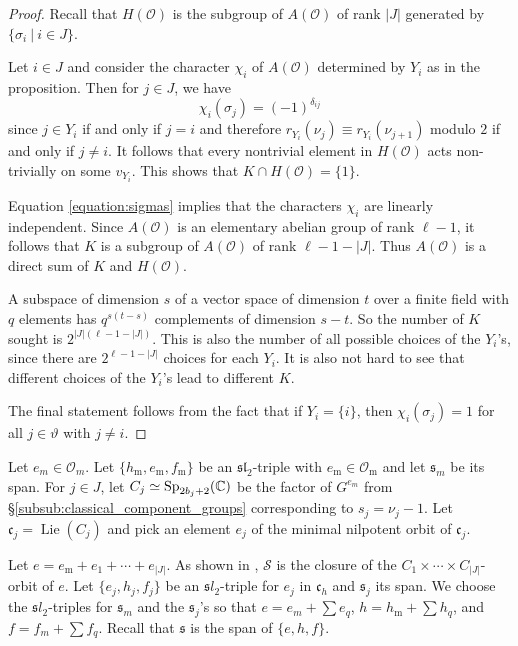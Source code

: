 \documentclass{amsart}
\theoremstyle{definition}
\DeclareMathOperator{\Lie}{Lie}
\newcommand{\C}{\mathbb{C}}
\newcommand{\m}{\mathrm{m}}
\newcommand{\cg}{\mathfrak{c}}
\newcommand{\fs}{\mathfrak{s}}
\newcommand{\0}{\mathcal{O}}
\begin{document}

\begin{proof}
Recall that $H(\0)$ is the subgroup of $A(\0)$ of rank $|J|$ 
generated by $\{\sigma_i \ | \ i \in J\}$. 

Let $i\in J$ and consider the character $\chi_i$ of $A(\0)$ determined by $Y_i$ as in the proposition.  
Then for $j \in J$, we have 
\begin{equation} \label{equation:sigmas}
\chi_i(\sigma_j)=(-1)^{\delta_{ij}}    
\end{equation}
since $j \in Y_i$ if and only if $j=i$ and therefore $r_{Y_i}(\nu_j) \equiv r_{Y_i}(\nu_{j+1})$ modulo $2$ if and only if $j \neq i$.
It follows that every nontrivial element in $H(\0)$ acts non-trivially 
on some $v_{Y_i}$.  This shows that $K \cap H(\0) = \{1\}$.

Equation \eqref{equation:sigmas} implies that the characters $\chi_i$ are linearly independent.  Since $A(\0)$ is an elementary abelian group of rank $\ell-1$, it follows that $K$ is a subgroup of $A(\0)$ of rank $\ell-1-|J|$.  Thus $A(\0)$ is a direct sum of $K$ and $H(\0)$.

A subspace of dimension $s$ of a  vector space of dimension $t$ over a finite field with $q$ elements has $q^{s(t-s)}$ complements of dimension $s-t$.
So the number of $K$ sought is $2^{|J|(\ell-1-|J|)}$.  This is also the number of all possible choices of the $Y_i$'s, since there are $2^{\ell-1-|J|}$ choices for each $Y_i$.  It is also not hard to see that different choices of the $Y_i$'s lead to different $K$.  

The final statement follows from the fact that if $Y_i = \{ i \}$, then 
$\chi_i(\sigma_j) = 1$ for all $j \in \vartheta$ with $j \neq i$.
\end{proof}


 Let $e_m \in \0_m$.  Let $\{ h_\m,e_\m,f_\m\}$ be an 
 $\mathfrak{sl}_2$-triple with $e_\m\in\0_\m$ and let $\fs_m$ be its span.
For $j\in J$, let $C_j \simeq {\rm Sp}_{2b_j+2}(\C)$ be the factor of $G^{e_m}$ from \S\ref{subsub:classical_component_groups} corresponding to $s_j = \nu_j-1$.  Let $\cg_j=\Lie(C_j)$ and pick an element $e_j$ of the minimal nilpotent orbit of $\cg_j$.


Let $e =  e_\m+e_1+\cdots + e_{|J|}$. 
As shown in \cite{FJLS23}, ${\mathcal S}$ is the closure of the $C_1\times\cdots \times C_{|J|}$-orbit of $e$.  
Let $\{e_j, h_j, f_j\}$ be an $\mathfrak sl_2$-triple for $e_j$ in $\cg_h$
and $\fs_j$ its span.  We choose the $\mathfrak sl_2$-triples for $\fs_m$
and the $\fs_j$'s so that $e= e_m + \sum e_q$, 
$h =h_\m + \sum h_q$, and $f=f_m + \sum f_q$.  Recall 
that $\fs$ is the span of $\{e,h, f\}$.
\end{document}

